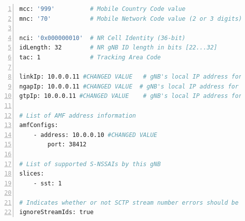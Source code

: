 \begin{lstlisting}[basicstyle=\small, frame=single, breaklines=true, postbreak=\mbox{\textcolor{red}{$\hookrightarrow$}\space}, escapeinside ={\%,}, escapechar={!}, numbers=left, language=sh, caption=gnb configuratie]
mcc: '999'          # Mobile Country Code value
mnc: '70'           # Mobile Network Code value (2 or 3 digits)

nci: '0x000000010'  # NR Cell Identity (36-bit)
idLength: 32        # NR gNB ID length in bits [22...32]
tac: 1              # Tracking Area Code

linkIp: 10.0.0.11 #CHANGED VALUE   # gNB's local IP address for Radio Link Simulation (Usually same with local IP)
ngapIp: 10.0.0.11 #CHANGED VALUE  # gNB's local IP address for N2 Interface (Usually same with local IP)
gtpIp: 10.0.0.11 #CHANGED VALUE    # gNB's local IP address for N3 Interface (Usually same with local IP)

# List of AMF address information
amfConfigs:
    - address: 10.0.0.10 #CHANGED VALUE
        port: 38412

# List of supported S-NSSAIs by this gNB
slices:
    - sst: 1

# Indicates whether or not SCTP stream number errors should be ignored.
ignoreStreamIds: true
\end{lstlisting}

\subsection{}%
\label{sec:ue_config}%


